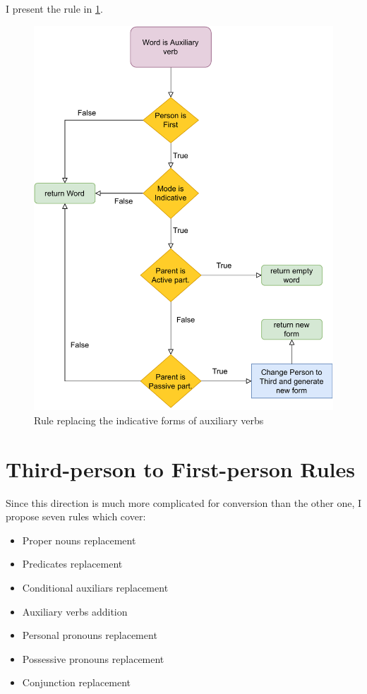 I present the rule in \ref{fig:icher-auxverb-rule}.

\begin{figure}[!htbp]
\includegraphics[width=\textwidth]{data/Icher-Auxverb-Rule.pdf}
\caption{Rule replacing the indicative forms of auxiliary verbs}
\label{fig:icher-auxverb-rule}
\end{figure}

\section{Third-person to First-person Rules}

Since this direction is much more complicated for conversion than the other one, I propose seven rules which cover:

\begin{itemize}
	\item Proper nouns replacement
	\item Predicates replacement
	\item Conditional auxiliars replacement
	\item Auxiliary verbs addition
	\item Personal pronouns replacement
	\item Possessive pronouns replacement
	\item Conjunction replacement
\end{itemize}

